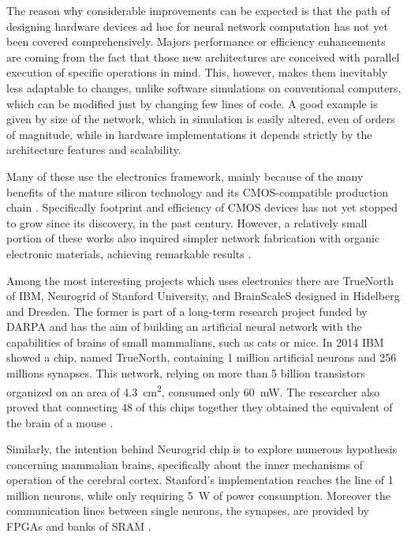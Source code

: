 The reason why considerable improvements can be expected is that the path of designing hardware devices ad hoc for neural network computation has not yet been covered comprehensively.
Majors performance or efficiency enhancements are coming from the fact that those new architectures are conceived with parallel execution of specific operations in mind.
This, however, makes them inevitably less adaptable to changes, unlike software simulations on conventional computers, which can be modified just by changing few lines of code.
A good example is given by size of the network, which in simulation is easily altered, even of orders of magnitude, while in hardware implementations it depends strictly by the architecture features and scalability.

Many of these use the electronics framework, mainly because of the many benefits of the mature silicon technology and its CMOS-compatible production chain \cite{}.
Specifically footprint and efficiency of CMOS devices has not yet stopped to grow since its discovery, in the past century.
However, a relatively small portion of these works also inquired simpler network fabrication with organic electronic materials, achieving remarkable results \cite{Nawrocki2016a}.

Among the most interesting projects which uses electronics there are TrueNorth of IBM, Neurogrid of Stanford University, and BrainScaleS designed in Hidelberg and Dresden.
The former is part of a long-term research project funded by DARPA and has the aim of building an artificial neural network with the capabilities of brains of small mammalians, such as cats or mice.
In 2014 IBM showed a chip, named TrueNorth, containing 1 million artificial neurons and 256 millions synapses.
This network, relying on more than 5 billion transistors organized on an area of \SI{4.3}{\square\cm}, consumed only \SI{60}{\mW}.
The researcher also proved that connecting 48 of this chips together they obtained the equivalent of the brain of a mouse \cite{Nawrocki2016a}.

Similarly, the intention behind Neurogrid chip is to explore numerous hypothesis concerning mammalian brains, specifically about the inner mechanisms of operation of the cerebral cortex.
Stanford's implementation reaches the line of 1 million neurons, while only requiring \SI{5}{\W} of power consumption.
Moreover the communication lines between single neurons, the synapses, are provided by FPGAs and banks of SRAM \cite{Nawrocki2016a}.

